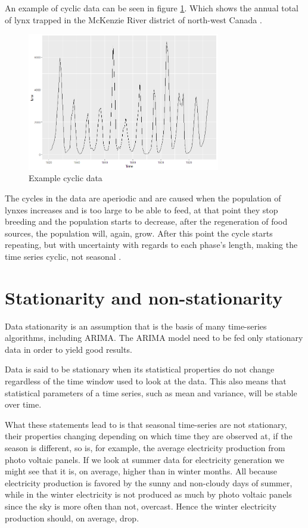 \documentclass[12pt,a4paper,titlepage]{report}
\begin{document}
An example of cyclic data can be seen in figure \ref{dlynx}. Which shows the annual total of lynx trapped in the McKenzie River district of north-west Canada \cite{fpp2stationarity}.
\begin{figure}[h]
    \centering
    \includegraphics[width=0.75\textwidth]{dlynx}
    \caption{Example cyclic data}
    \label{dlynx}
\end{figure}

The cycles in the data are aperiodic and are caused when the population of lynxes increases and is too large to be able to feed, at that point they stop breeding and the population starts to decrease, after the regeneration of food sources, the population will, again, grow. After this point the cycle starts repeating, but with uncertainty with regards to each phase's length, making the time series cyclic, not seasonal \cite{fpp2stationarity}.

\section{Stationarity and non-stationarity}

Data stationarity is an assumption that is the basis of many time-series algorithms, including ARIMA. The ARIMA model need to be fed only stationary data in order to yield good results.

Data is said to be stationary when its statistical properties do not change regardless of the time window used to look at the data. This also means that statistical parameters of a time series, such as mean and variance, will be stable over time. \cite{fpp2stationarity}

What these statements lead to is that seasonal time-series are not stationary, their properties changing depending on which time they are observed at, if the season is different, so is, for example, the average electricity production from photo voltaic panels. If we look at summer data for electricity generation we might see that it is, on average, higher than in winter months. All because electricity production is favored by the sunny and non-cloudy days of summer, while in the winter electricity is not produced as much by photo voltaic panels since the sky is more often than not, overcast. Hence the winter electricity production should, on average, drop.
\end{document}
